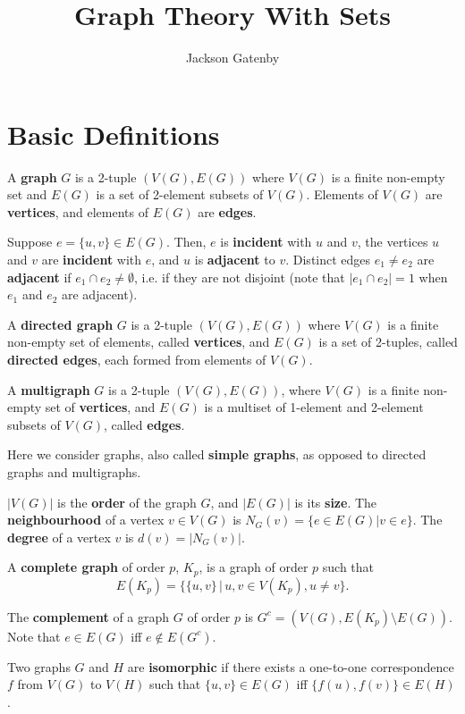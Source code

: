 \documentclass[a4paper,12pt]{article}
\begin{document}
\title{Graph Theory With Sets}
\author{Jackson Gatenby}
\maketitle

\section{Basic Definitions}

A {\bf graph} $G$ is a 2-tuple $(V(G), E(G))$ where $V(G)$ is a finite non-empty
set and $E(G)$ is a set of 2-element subsets of $V(G)$. Elements of $V(G)$ are
{\bf vertices}, and elements of $E(G)$ are {\bf edges}.

Suppose $e = \{u, v\} \in E(G)$. Then, $e$ is {\bf incident} with $u$ and $v$, the
vertices $u$ and $v$ are {\bf incident} with $e$, and $u$ is {\bf adjacent}
to $v$. Distinct edges $e_1 \neq e_2$ are {\bf adjacent} if $e_1 \cap e_2 \neq
\emptyset$, i.e. if they are not disjoint (note that $|e_1 \cap e_2| = 1$ when
$e_1$ and $e_2$ are adjacent).

A {\bf directed graph} $G$ is a 2-tuple $(V(G), E(G))$ where $V(G)$ is a finite
non-empty set of elements, called {\bf vertices}, and $E(G)$ is a set of
2-tuples, called {\bf directed edges}, each formed from elements of $V(G)$.

A {\bf multigraph} $G$ is a 2-tuple $(V(G), E(G))$, where $V(G)$ is a finite
non-empty set of {\bf vertices}, and $E(G)$ is a multiset of 1-element and
2-element subsets of $V(G)$, called {\bf edges}.

Here we consider graphs, also called {\bf simple graphs}, as opposed to
directed graphs and multigraphs.

$|V(G)|$ is the {\bf order} of the graph $G$, and $|E(G)|$ is its {\bf size}.
The {\bf neighbourhood} of a vertex $v \in V(G)$ is
$N_G(v) = \{e \in E(G) | v \in e\}$.
The {\bf degree} of a vertex $v$ is $d(v) = |N_G(v)|$.

A {\bf complete graph} of order $p$, $K_p$, is a graph of order $p$ such that
\[ E(K_p) = \{\{u, v\} \,|\, u, v \in V(K_p), u \neq v\}. \]

The {\bf complement} of a graph $G$ of order $p$ is
$G^c = (V(G), E(K_p) \setminus E(G))$. Note that $e \in E(G)$ iff $e \not\in E(G^c)$.

Two graphs $G$ and $H$ are {\bf isomorphic} if there exists a one-to-one
correspondence $f$ from $V(G)$ to $V(H)$ such that $\{u, v\} \in E(G)$ iff
$\{f(u), f(v)\} \in E(H)$.
\end{document}
